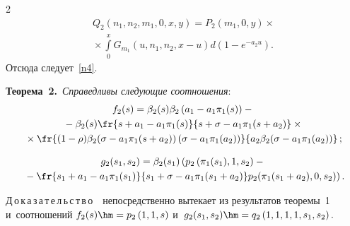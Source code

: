 \begin{multicols}{2}
\noindent
\begin{multline*}
Q_2\left(n_1,n_2,m_1,0,x,y\right)=
P_2\left(m_1,0,y\right)\times{}\\
{}\times
\int\limits_0^xG_{m_1}\left(u,n_1,n_2,x-u\right)d\left(1-e^{-a_2u}\right).
\end{multline*}
Отсюда следует~\eqref{n4}.

\smallskip

\noindent
\textbf{Теорема~2.}\
\textit{Справедливы следующие соотношения}:
\begin{multline*}
f_2(s)=\beta_2(s)\beta_2
\left(a_1-a_1\pi_1(s)\right)-{}\\
{}-\beta_2(s)
\fr{s+a_1-a_1\pi_1(s)}{s+\sigma-a_1\pi_1(s+a_2)}\times{}\\
{}\times\fr{(1-\rho)\beta_2(\sigma-a_1\pi_1(s+a_2))
\left(\sigma-a_1\pi_1(a_2)\right)}{a_2\beta_2(\sigma-a_1\pi_1(a_2))}\,;
\end{multline*}


\vspace*{-12pt}

\noindent
\begin{multline*}
g_2(s_1,s_2)=\beta_2(s_1)\left(
\vphantom{\fr{s_1+a_1-a_1\pi_1(s_1)}{s_1+\sigma-a_1\pi_1(s_1+a_2)}}
p_2\left(\pi_1(s_1),1,s_2\right)-{}\right.\\
\left.{}-
\fr{s_1+a_1-a_1\pi_1(s_1)}{s_1+\sigma-a_1\pi_1(s_1+a_2)}
p_2(\pi_1(s_1+a_2),0,s_2)\right).
\end{multline*}

\noindent
Д\,о\,к\,а\,з\,а\,т\,е\,л\,ь\,с\,т\,в\,о\ \
 непосредственно вытекает из результатов теоремы~1 и~соотношений
$f_2(s)\hm=p_2\left(1,1,s\right)$ и~$g_2(s_1,s_2)\hm=q_2\left(1,1,1,1,s_1,s_2\right).
$


\smallskip


\end{multicols}

